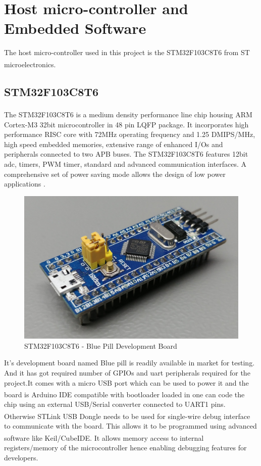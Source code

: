 \section{Host micro-controller and Embedded Software }
\indent The host micro-controller used in this project is the STM32F103C8T6 from ST microelectronics\textsuperscript{\textregistered}. 

\subsection{STM32F103C8T6}
The STM32F103C8T6 is a medium density performance line chip housing ARM\textsuperscript{\textregistered} Cortex-M3 32bit microcontroller in 48 pin LQFP package. It incorporates high performance RISC core with 72MHz operating frequency and 1.25 DMIPS/MHz, high speed embedded memories, extensive range of enhanced I/Os and peripherals connected to two APB buses. The STM32F103C8T6 features 12bit \acrshort{adc}, timers, PWM timer, standard and advanced communication interfaces. A comprehensive set of power saving mode allows the design of low power applications \cite{stm:bluepill}.

\begin{figure}[!h]
    \centering
    \includegraphics[scale=0.5]{Chapter4/STM32F103C8T6_Blue_Pill-1.jpg}
    \caption{STM32F103C8T6 - Blue Pill Development Board}
\end{figure}

It's development board named Blue pill is readily available in market for testing. And it has got required number of GPIOs and \acrshort{uart} peripherals required for the project.It comes with a micro USB port which can be used to power it and the board is  Arduino\textsuperscript{\textregistered} IDE compatible with bootloader loaded in one can code the chip using an external USB/Serial converter connected to UART1 pins. Otherwise STLink\textsuperscript{\textregistered} USB Dongle needs to be used for single-wire debug interface to communicate with the board. This allows it to be programmed using advanced software like Keil\textsuperscript{\textregistered}/CubeIDE\textsuperscript{\textregistered}. It allows memory access to internal registers/memory of the microcontroller hence enabling debugging features for developers.

